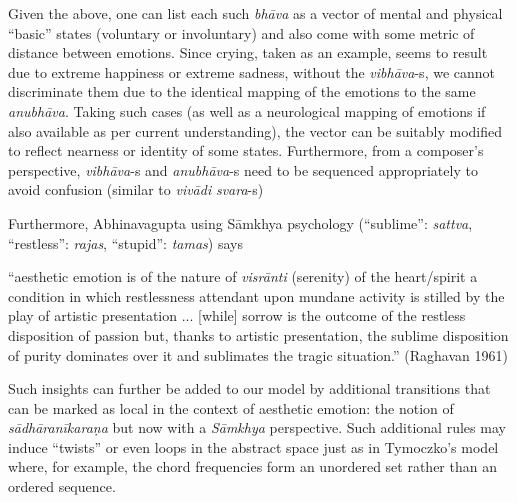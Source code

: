 Given the above, one can list each such \textsl{bhāva} as a vector of mental and physical “basic” states (voluntary or involuntary) and also come with some metric of distance between emotions. Since crying, taken as an example, seems to result due to extreme happiness or extreme sadness, without the \textsl{vibhāva}-s, we cannot discriminate them due to the identical mapping of the emotions to the same \textsl{anubhāva}. Taking such cases (as well as a neurological mapping of emotions if also available as per current understanding), the vector can be suitably modified to reflect nearness or identity of some states. Furthermore, from a composer’s perspective, \textsl{vibhāva}-s and \textsl{anubhāva}-s need to be sequenced appropriately to avoid confusion (similar to \textsl{vivādi} \textsl{svara}-s)

Furthermore, Abhinavagupta using Sāmkhya psychology (“sublime”: \textsl{sattva}, “restless”: \textsl{rajas}, “stupid”: \textsl{tamas}) says

\begin{myquote}
“aesthetic emotion is of the nature of \textsl{visrānti} (serenity) of the heart/spirit a condition in which restlessness attendant upon mundane activity is stilled by the play of artistic presentation ... [while] sorrow is the outcome of the restless disposition of passion but, thanks to artistic presentation, the sublime disposition of purity dominates over it and sublimates the tragic situation.” 
\hfill(Raghavan 1961)
\end{myquote}

Such insights can further be added to our model by additional transitions that can be marked as local in the context of aesthetic emotion: the notion of \textsl{sādhāranīkaraṇa} but now with a \textsl{Sāmkhya} perspective. Such additional rules may induce “twists” or even loops in the abstract space just as in Tymoczko’s model where, for example, the chord frequencies form an unordered set rather than an ordered sequence.

